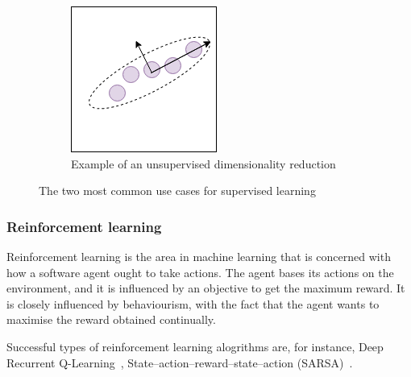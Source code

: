 \begin{figure}
\begin{subfigure}[b]{0.34\textwidth}
         \includegraphics[width=\textwidth]{background/figures/unsupervised_PCA.png}
         \caption{Example of an unsupervised dimensionality reduction}
         \label{fig:supervised_regression}
     \end{subfigure}
        \caption{The two most common use cases for supervised learning}
        \label{fig:supervised_learning}
\end{figure}
      

      
\subsubsection{Reinforcement learning}
Reinforcement learning is the area in machine learning that is concerned with how a software agent ought to take actions.
The agent bases its actions on the environment, and it is influenced by an objective to get the maximum reward.
It is closely influenced by behaviourism, with the fact that the agent wants to maximise the reward obtained continually. 

Successful types of reinforcement learning alogrithms are, for instance, Deep Recurrent Q-Learning~\cite{DBLP:journals/corr/HausknechtS15}, State–action–reward–state–action (SARSA)~\cite{Rummery94on-lineq-learning}.



